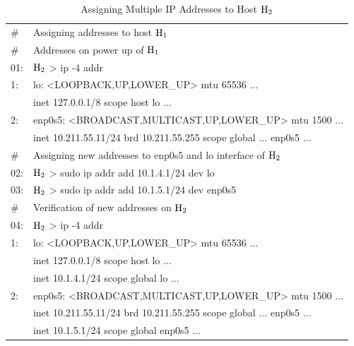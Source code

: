 \begin{table}[H]
\caption{Assigning Multiple IP Addresses to Host ${\rm H}_{2}$}\label{chap2-table-5}
\begin{center}
\begin{tabular}{|l@{\;}l|}
\hline
\# & Assigning addresses to host ${\rm H}_{1}$\\
\# & Addresses on power up of ${\rm H}_{1}$\\
01:& ${\rm H}_{2}$ > ip -4 addr\\
1: & lo: <LOOPBACK,UP,LOWER\_UP> mtu 65536 $\ldots$\\
    &\quad inet 127.0.0.1/8 scope host lo $\ldots$\\
2: & enp0s5: <BROADCAST,MULTICAST,UP,LOWER\_UP> mtu 1500 $\ldots$\\
   & \quad inet 10.211.55.11/24 brd 10.211.55.255 scope global $\ldots$ enp0s5 $\ldots$\\
    \hline
\# & Assigning new addresses to enp0s5 and lo interface of ${\rm H}_{2}$\\
02: & ${\rm H}_{2}$ > sudo ip addr add 10.1.4.1/24 dev lo\\
03: & ${\rm H}_{2}$ > sudo ip addr add 10.1.5.1/24 dev enp0s5\\
\hline
\# & Verification of new addresses on ${\rm H}_{2}$\\
04:& ${\rm H}_{2}$ > ip -4 addr\\
1:& lo: <LOOPBACK,UP,LOWER\_UP> mtu 65536 $\ldots$\\
   & \quad inet 127.0.0.1/8 scope host lo $\dots$\\
   &  \quad inet 10.1.4.1/24 scope global lo $\ldots$\\
  \hline 
2:& enp0s5: <BROADCAST,MULTICAST,UP,LOWER\_UP> mtu 1500 $\ldots$\\
   & \quad inet 10.211.55.11/24 brd 10.211.55.255 scope global $\ldots$ enp0s5 $\ldots$\\
   & \quad inet 10.1.5.1/24 scope global enp0s5 $\ldots$\\
   \hline
\end{tabular}
\end{center}
\end{table}

\vspace{-1.1cm}

